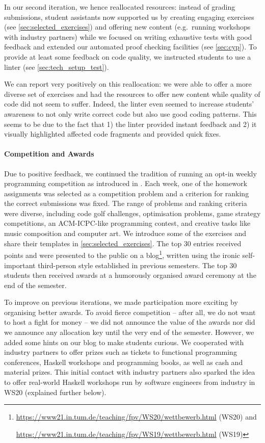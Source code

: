 In our second iteration, we hence reallocated resources:
instead of grading submissions,
student assistants now supported us by creating engaging exercises
(see \cref{sec:selected_exercises})
and offering new content (e.g.\ running workshops with industry partners)
while we focused on writing exhaustive tests with good feedback and extended our automated proof checking facilities (see \cref{sec:cyp}).
To provide at least some feedback on
code quality, we instructed students
to use a linter (see \cref{sec:tech_setup_test}).

We can report very positively on this reallocation:
we were able to offer a more diverse set of exercises and
had the resources to offer new content
while quality of code did not seem to suffer.
Indeed, the linter even seemed to increase students' awareness
to not only write correct code but also use good coding patterns.
This seems to be due to the fact that 1) the linter provided instant feedback and 2) it visually highlighted affected code fragments and provided quick fixes.

\paragraph{Competition and Awards}
Due to positive feedback,
we continued the tradition of running an opt-in weekly
programming competition as introduced in \cite{next_1100}.
Each week, one of the homework assignments
was selected as a competition problem
and a criterion for ranking the correct submissions was fixed.
The range of problems and ranking criteria were diverse,
including code golf challenges,
optimisation problems,
game strategy competitions,
an ACM-ICPC-like programming contest,
and creative tasks like music composition
and computer art.
We introduce some of the exercises and share their templates in \cref{sec:selected_exercises}.
The top 30 entries received points
and were presented to the public on a blog\footnote{\url{https://www21.in.tum.de/teaching/fpv/WS20/wettbewerb.html} (WS20) and

\url{https://www21.in.tum.de/teaching/fpv/WS19/wettbewerb.html} (WS19)},
written using the ironic self-important third-person style established in previous semesters.
The top 30 students then received awards at
a humorously organised award ceremony at the end of the semester.

To improve on previous iterations,
we made participation more exciting by organising better awards.
To avoid fierce competition -- after all, we do not want to host a fight for money --
we did not announce the value of the awards nor did we announce any allocation key
until the very end of the semester.
However, we added some hints on our blog to make students curious.
We cooperated with industry partners
to offer prizes such as tickets to functional programming conferences,
Haskell workshops and programming books, as well as cash and material prizes.
This initial contact with industry partners
also sparked the idea to offer real-world Haskell workshops
run by software engineers from industry in WS20 (explained further below).

